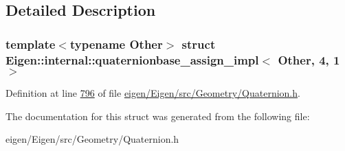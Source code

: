\subsection{Detailed Description}
\subsubsection*{template$<$typename Other$>$\newline
struct Eigen\+::internal\+::quaternionbase\+\_\+assign\+\_\+impl$<$ Other, 4, 1 $>$}



Definition at line \hyperlink{eigen_2_eigen_2src_2_geometry_2_quaternion_8h_source_l00796}{796} of file \hyperlink{eigen_2_eigen_2src_2_geometry_2_quaternion_8h_source}{eigen/\+Eigen/src/\+Geometry/\+Quaternion.\+h}.



The documentation for this struct was generated from the following file\+:\begin{DoxyCompactItemize}
\item 
eigen/\+Eigen/src/\+Geometry/\+Quaternion.\+h\end{DoxyCompactItemize}
